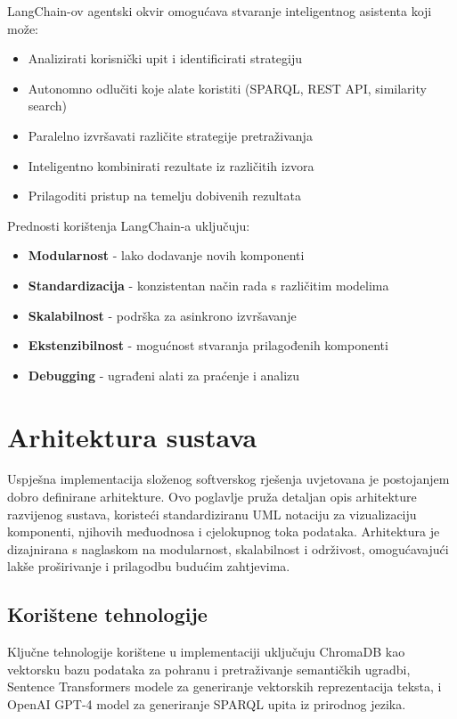 LangChain-ov agentski okvir omogućava stvaranje inteligentnog asistenta koji može:

\begin{itemize}
    \item Analizirati korisnički upit i identificirati strategiju
    \item Autonomno odlučiti koje alate koristiti (SPARQL, REST API, similarity search)
    \item Paralelno izvršavati različite strategije pretraživanja
    \item Inteligentno kombinirati rezultate iz različitih izvora
    \item Prilagoditi pristup na temelju dobivenih rezultata
\end{itemize}

Prednosti korištenja LangChain-a uključuju:

\begin{itemize}
    \item \textbf{Modularnost} - lako dodavanje novih komponenti
    \item \textbf{Standardizacija} - konzistentan način rada s različitim modelima
    \item \textbf{Skalabilnost} - podrška za asinkrono izvršavanje
    \item \textbf{Ekstenzibilnost} - mogućnost stvaranja prilagođenih komponenti
    \item \textbf{Debugging} - ugrađeni alati za praćenje i analizu
\end{itemize}

\chapter{Arhitektura sustava}
\label{ch:system_architecture}

Uspješna implementacija složenog softverskog rješenja uvjetovana je postojanjem dobro definirane arhitekture. Ovo poglavlje pruža detaljan opis arhitekture razvijenog sustava, koristeći standardiziranu UML notaciju za vizualizaciju komponenti, njihovih međuodnosa i cjelokupnog toka podataka. Arhitektura je dizajnirana s naglaskom na modularnost, skalabilnost i održivost, omogućavajući lakše proširivanje i prilagodbu budućim zahtjevima.

\section{Korištene tehnologije}

Ključne tehnologije korištene u implementaciji uključuju ChromaDB kao vektorsku bazu podataka za pohranu i pretraživanje semantičkih ugradbi, Sentence Transformers modele za generiranje vektorskih reprezentacija teksta, i OpenAI GPT-4 model za generiranje SPARQL upita iz prirodnog jezika.

